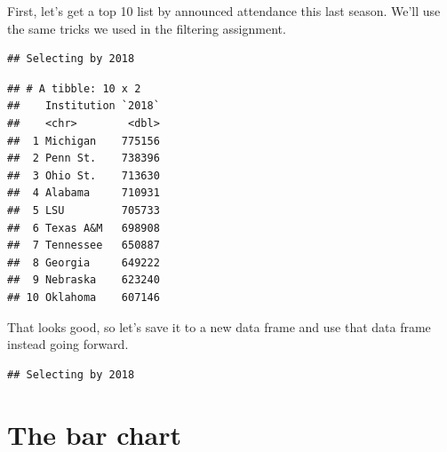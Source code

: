 \documentclass[]{book}
\newenvironment{Shaded}{\begin{snugshade}}{\end{snugshade}}
\newcommand{\DataTypeTok}[1]{\textcolor[rgb]{0.13,0.29,0.53}{#1}}
\newcommand{\DecValTok}[1]{\textcolor[rgb]{0.00,0.00,0.81}{#1}}
\newcommand{\KeywordTok}[1]{\textcolor[rgb]{0.13,0.29,0.53}{\textbf{#1}}}
\newcommand{\NormalTok}[1]{#1}
\newcommand{\OperatorTok}[1]{\textcolor[rgb]{0.81,0.36,0.00}{\textbf{#1}}}
\newcommand{\StringTok}[1]{\textcolor[rgb]{0.31,0.60,0.02}{#1}}
\begin{document}
First, let's get a top 10 list by announced attendance this last season. We'll use the same tricks we used in the filtering assignment.

\begin{Shaded}
\end{Shaded}

\begin{verbatim}
## Selecting by 2018
\end{verbatim}

\begin{verbatim}
## # A tibble: 10 x 2
##    Institution `2018`
##    <chr>        <dbl>
##  1 Michigan    775156
##  2 Penn St.    738396
##  3 Ohio St.    713630
##  4 Alabama     710931
##  5 LSU         705733
##  6 Texas A&M   698908
##  7 Tennessee   650887
##  8 Georgia     649222
##  9 Nebraska    623240
## 10 Oklahoma    607146
\end{verbatim}

That looks good, so let's save it to a new data frame and use that data frame instead going forward.

\begin{Shaded}
\end{Shaded}

\begin{verbatim}
## Selecting by 2018
\end{verbatim}

\hypertarget{the-bar-chart}{%
\section{The bar chart}\label{the-bar-chart}}
\end{document}
